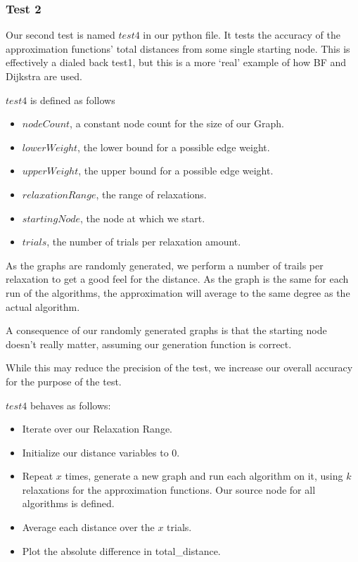 \documentclass{article}
\begin{document}
\subsubsection{Test 2}

Our second test is named $test4$ in our python file. It tests the accuracy of the approximation functions' total distances from some single starting node. This is effectively a dialed back test1, but this is a more `real' example of how BF and Dijkstra are used.

$test4$ is defined as follows
\begin{itemize}
    \item $nodeCount$, a constant node count for the size of our Graph.
    \item $lowerWeight$, the lower bound for a possible edge weight.
    \item $upperWeight$, the upper bound for a possible edge weight.
    \item $relaxationRange$, the range of relaxations.
    \item $startingNode$, the node at which we start.
    \item $trials$, the number of trials per relaxation amount.
\end{itemize}

As the graphs are randomly generated, we perform a number of trails per relaxation to get a good feel for the distance. As the graph is the same for each run of the algorithms, the approximation will average to the same degree as the actual algorithm. 

A consequence of our randomly generated graphs is that the starting node doesn't really matter, assuming our generation function is correct.

While this may reduce the precision of the test, we increase our overall accuracy for the purpose of the test.

$test4$ behaves as follows:
\begin{itemize}
    \item Iterate over our Relaxation Range.
    \item Initialize our distance variables to 0.
    \item Repeat $x$ times, generate a new graph and run each algorithm on it, using $k$ relaxations for the approximation functions. Our source node for all algorithms is defined.
    \item Average each distance over the $x$ trials.
    \item Plot the absolute difference in total\_distance.
\end{itemize}
\end{document}
